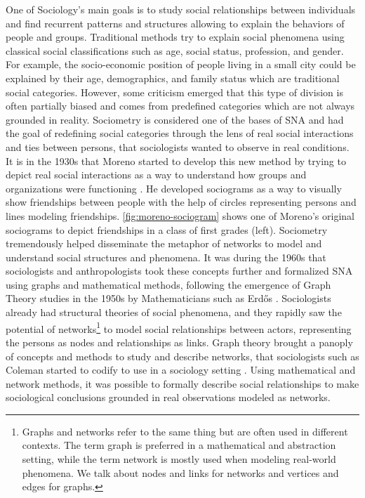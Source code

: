 One of Sociology's main goals is to study social relationships between individuals and find recurrent patterns and structures allowing to explain the behaviors of people and groups.
Traditional methods try to explain social phenomena using classical social classifications such as age, social status, profession, and gender.
For example, the socio-economic position of people living in a small city could be explained by their age, demographics, and family status which are traditional social categories.
However, some criticism emerged that this type of division is often partially biased and comes from predefined categories which are not always grounded in reality.
Sociometry is considered one of the bases of SNA and had the goal of redefining social categories through the lens of real social interactions and ties between persons, that sociologists wanted to observe in real conditions.
It is in the 1930s that Moreno started to develop this new method by trying to depict real social interactions as a way to understand how groups and organizations were functioning \cite{morenoFoundationsSociometryIntroduction1941}.
He developed sociograms as a way to visually show friendships between people with the help of circles representing persons and lines modeling friendships.
\autoref{fig:moreno-sociogram} shows one of Moreno's original sociograms to depict friendships in a class of first grades (left).
Sociometry tremendously helped disseminate the metaphor of networks to model and understand social structures and phenomena.
It was during the 1960s that sociologists and anthropologists took these concepts further and formalized SNA using graphs and mathematical methods, following the emergence of Graph Theory studies in the 1950s by Mathematicians such as Erd\H{o}s \cite{erdos2011}.
Sociologists already had structural theories of social phenomena, and they rapidly saw the potential of networks\footnote{Graphs and networks refer to the same thing but are often used in different contexts. The term graph is preferred in a mathematical and abstraction setting, while the term network is mostly used when modeling real-world phenomena. We talk about nodes and links for networks and vertices and edges for graphs.} to model social relationships between actors, representing the persons as nodes and relationships as links.
Graph theory brought a panoply of concepts and methods to study and describe networks, that sociologists such as Coleman started to codify to use in a sociology setting \cite{colemanIntroductionMathematicalSociology1964}.
Using mathematical and network methods, it was possible to formally describe social relationships to make sociological conclusions grounded in real observations modeled as networks.



